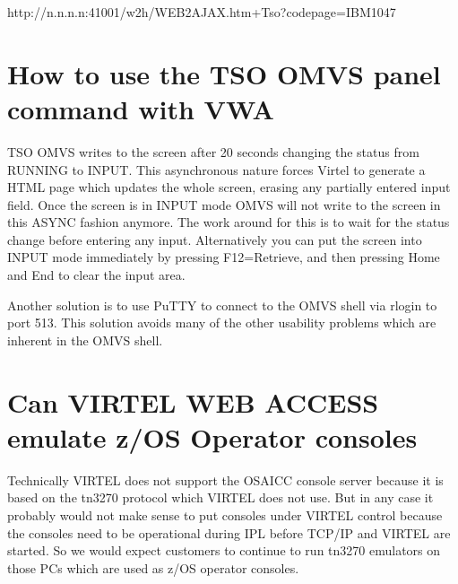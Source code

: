 \documentclass[letterpaper,10pt,english]{sphinxmanual}
\begin{document}
\begin{sphinxVerbatim}[commandchars=\\\{\}]
http://n.n.n.n:41001/w2h/WEB2AJAX.htm+Tso?codepage=IBM1047
\end{sphinxVerbatim}

\ignorespaces 

\section{How to use the TSO OMVS panel command with VWA}
\label{\detokenize{Customization:how-to-use-the-tso-omvs-panel-command-with-vwa}}\label{\detokenize{Customization:index-128}}
\sphinxAtStartPar
TSO OMVS writes to the screen after 20 seconds changing the status from RUNNING to INPUT. This asynchronous nature forces Virtel to generate a HTML page which updates the whole screen, erasing any partially entered input field. Once the screen is in INPUT mode OMVS will not write to the screen in this ASYNC fashion anymore. The work around for this is to wait for the status change before entering any input. Alternatively you can put the screen into INPUT mode immediately by pressing F12=Retrieve, and then pressing Home and End to clear the input area.

\sphinxAtStartPar
Another solution is to use PuTTY to connect to the OMVS shell via rlogin to port 513. This solution avoids many of the other usability problems which are inherent in the OMVS shell.

\ignorespaces 

\section{Can VIRTEL WEB ACCESS emulate z/OS Operator consoles}
\label{\detokenize{Customization:can-virtel-web-access-emulate-z-os-operator-consoles}}\label{\detokenize{Customization:index-129}}
\sphinxAtStartPar
Technically VIRTEL does not support the OSA\sphinxhyphen{}ICC console server because it is based on the tn3270 protocol which VIRTEL does not use. But in any case it probably would not make sense to put consoles under VIRTEL control because the consoles need to be operational during IPL before TCP/IP and VIRTEL are started. So we would expect customers to continue to run tn3270 emulators on those PCs which are used as z/OS operator consoles.
\end{document}
